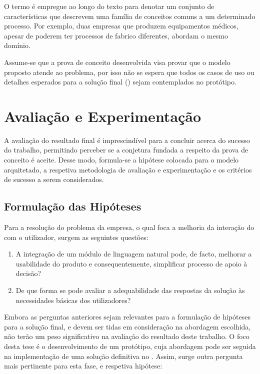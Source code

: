 O termo  é empregue ao longo do texto para denotar um conjunto de características que descrevem uma família de conceitos comuns a um determinado processo. Por exemplo, duas empresas que produzem equipamentos médicos, apesar de poderem ter processos de fabrico diferentes, abordam o mesmo domínio.

Assume-se que a prova de conceito desenvolvida visa provar que o modelo proposto atende ao problema, por isso não se espera que todos os casos de uso ou detalhes esperados para a solução final () sejam contemplados no protótipo.

\section{Avaliação e Experimentação}
\label{sec:chap01_solutionevaluation}
A avaliação do resultado final é imprescindível para a concluir acerca do sucesso do trabalho, permitindo perceber se a conjetura fundada a respeito da prova de conceito é aceite. Desse modo, formula-se a hipótese colocada para o modelo arquitetado, a respetiva metodologia de avaliação e experimentação e os critérios de sucesso a serem considerados.

\subsection{Formulação das Hipóteses}
\label{sec:chap01_hypothesis}
Para a resolução do problema da empresa, o qual foca a melhoria da interação do {\productname} com o utilizador, surgem as seguintes questões:

\begin{enumerate}
    \item
    {
        A integração de um módulo de linguagem natural pode, de facto, melhorar a usabilidade do produto e consequentemente, simplificar processo de apoio à decisão?
    }
    \item
    {
        De que forma se pode avaliar a adequabilidade das respostas da solução às necessidades básicas dos utilizadores?
    }
\end{enumerate}

Embora as perguntas anteriores sejam relevantes para a formulação de hipóteses para a solução final, e devem ser tidas em consideração na abordagem escolhida, não terão um peso significativo na avaliação do resultado deste trabalho. O foco desta tese é o desenvolvimento de um protótipo, cuja abordagem pode ser seguida na implementação de uma solução definitiva no {\productname}. Assim, surge outra pergunta mais pertinente para esta fase, e respetiva hipótese:

